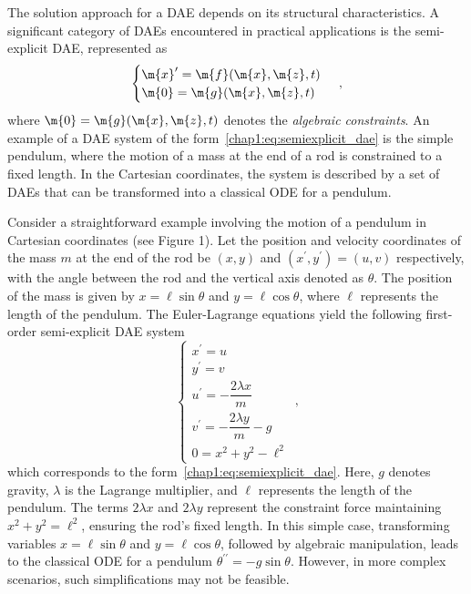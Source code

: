 The solution approach for a \ac{DAE} depends on its structural characteristics. A significant category of \acp{DAE} encountered in practical applications is the semi-explicit \ac{DAE}, represented as
%
\begin{equation}
  \begin{cases}
    \m{x}^{\prime} = \m{f}(\m{x}, \m{z}, t) \\
    \m{0} = \m{g}(\m{x}, \m{z}, t)
  \end{cases} \, \text{,}
  \label{chap1:eq:semiexplicit_dae}
\end{equation}
%
where $\m{0} = \m{g}(\m{x}, \m{z}, t)$ denotes the \emph{algebraic constraints}. An example of a \ac{DAE} system of the form~\eqref{chap1:eq:semiexplicit_dae} is the simple pendulum, where the motion of a mass at the end of a rod is constrained to a fixed length. In the Cartesian coordinates, the system is described by a set of \acp{DAE} that can be transformed into a classical \ac{ODE} for a pendulum.
%
\begin{example}
  Consider a straightforward example involving the motion of a pendulum in Cartesian coordinates (see Figure 1). Let the position and velocity coordinates of the mass $m$ at the end of the rod be $(x, y)$ and $(x^{\prime}, y^{\prime}) = (u, v)$ respectively, with the angle between the rod and the vertical axis denoted as $\theta$. The position of the mass is given by $x = \ell\sin{\theta}$ and $y = \ell\cos{\theta}$, where $\ell$ represents the length of the pendulum. The Euler-Lagrange equations yield the following first-order semi-explicit \ac{DAE} system
  \begin{equation*}
    \begin{cases}
      x^{\prime} = u \\[0.5em]
      y^{\prime} = v \\[0.5em]
      u^{\prime} = -\dfrac{2 \lambda x}{m} \\[0.5em]
      v^{\prime} = -\dfrac{2 \lambda y}{m} - g \\[0.5em]
      0 = x^2 + y^2 - \ell^2
    \end{cases} \, \text{,}
  \end{equation*}
  which corresponds to the form~\eqref{chap1:eq:semiexplicit_dae}. Here, $g$ denotes gravity, $\lambda$ is the Lagrange multiplier, and $\ell$ represents the length of the pendulum. The terms $2 \lambda x$ and $2 \lambda y$ represent the constraint force maintaining $x^2 + y^2 = \ell^2$, ensuring the rod's fixed length. In this simple case, transforming variables $x = \ell\sin{\theta}$ and $y = \ell\cos{\theta}$, followed by algebraic manipulation, leads to the classical \ac{ODE} for a pendulum $\theta^{\prime\prime} = -g\sin{\theta}$. However, in more complex scenarios, such simplifications may not be feasible.
\end{example}
